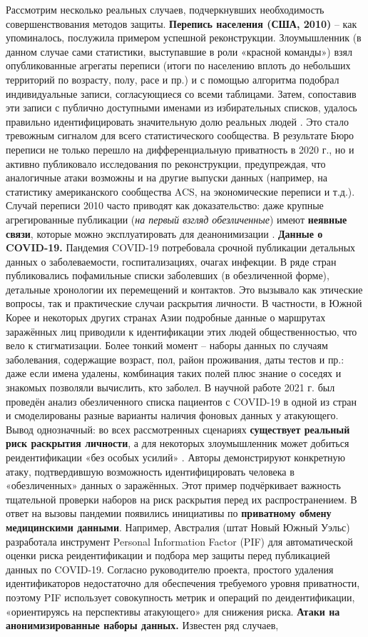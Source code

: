 Рассмотрим несколько реальных случаев, подчеркнувших необходимость совершенствования методов защиты. \textbf{Перепись населения (США, 2010)} – как упоминалось, послужила примером успешной реконструкции. Злоумышленник (в данном случае сами статистики, выступавшие в роли «красной команды») взял опубликованные агрегаты переписи (итоги по населению вплоть до небольших территорий по возрасту, полу, расе и пр.) и с помощью алгоритма подобрал индивидуальные записи, согласующиеся со всеми таблицами. Затем, сопоставив эти записи с публично доступными именами из избирательных списков, удалось правильно идентифицировать значительную долю реальных людей \autocite{cornell-edu}. Это стало тревожным сигналом для всего статистического сообщества. В результате Бюро переписи не только перешло на дифференциальную приватность в 2020 г., но и активно публиковало исследования по реконструкции, предупреждая, что аналогичные атаки возможны и на другие выпуски данных (например, на статистику американского сообщества ACS, на экономические переписи и т.д.). Случай переписи 2010 часто приводят как доказательство: даже крупные агрегированные публикации (\textit{на первый взгляд обезличенные}) имеют \textbf{неявные связи}, которые можно эксплуатировать для деанонимизации \autocite{cornell-edu}. \textbf{Данные о COVID-19.} Пандемия COVID-19 потребовала срочной публикации детальных данных о заболеваемости, госпитализациях, очагах инфекции. В ряде стран публиковались пофамильные списки заболевших (в обезличенной форме), детальные хронологии их перемещений и контактов. Это вызывало как этические вопросы, так и практические случаи раскрытия личности. В частности, в Южной Корее и некоторых других странах Азии подробные данные о маршрутах заражённых лиц приводили к идентификации этих людей общественностью, что вело к стигматизации. Более тонкий момент – наборы данных по случаям заболевания, содержащие возраст, пол, район проживания, даты тестов и пр.: даже если имена удалены, комбинация таких полей плюс знание о соседях и знакомых позволяли вычислить, кто заболел. В научной работе 2021 г. был проведён анализ обезличенного списка пациентов с COVID-19 в одной из стран и смоделированы разные варианты наличия фоновых данных у атакующего. Вывод однозначный: во всех рассмотренных сценариях \textbf{существует реальный риск раскрытия личности}, а для некоторых злоумышленник может добиться реидентификации «без особых усилий» \autocite{journals-plos-org}. Авторы демонстрируют конкретную атаку, подтвердившую возможность идентифицировать человека в «обезличенных» данных о заражённых. Этот пример подчёркивает важность тщательной проверки наборов на риск раскрытия перед их распространением. В ответ на вызовы пандемии появились инициативы по \textbf{приватному обмену медицинскими данными}. Например, Австралия (штат Новый Южный Уэльс) разработала инструмент Personal Information Factor (PIF) для автоматической оценки риска реидентификации и подбора мер защиты перед публикацией данных по COVID-19. Согласно руководителю проекта, простого удаления идентификаторов недостаточно для обеспечения требуемого уровня приватности, поэтому PIF использует совокупность метрик и операций по деидентификации, «ориентируясь на перспективы атакующего» для снижения риска. \textbf{Атаки на анонимизированные наборы данных.} Известен ряд случаев, 